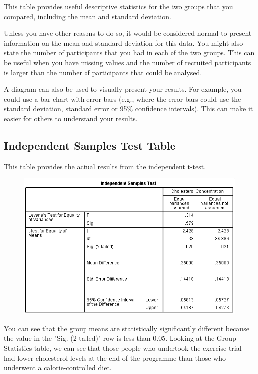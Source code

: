 \documentclass[]{article}
\begin{document}
	This table provides useful descriptive statistics for the two groups that you compared, including the mean and standard deviation.
	

	Unless you have other reasons to do so, it would be considered normal to present information on the mean and standard deviation for this data. You might also state the number of participants that you had in each of the two groups. This can be useful when you have missing values and the number of recruited participants is larger than the number of participants that could be analysed.
	
	
	A diagram can also be used to visually present your results. For example, you could use a bar chart with error bars (e.g., where the error bars could use the standard deviation, standard error or 95\% confidence intervals). This can make it easier for others to understand your results.
	
	\newpage
\subsection{Independent Samples Test Table}
	This table provides the actual results from the independent t-test.
	
\begin{figure}[h!]
	\centering
	\includegraphics[width=0.6\linewidth]{TwoSample/TwoSampleOutput2}
	
	\label{fig:TwoSampleOutput2}
\end{figure}

	You can see that the group means are statistically significantly different because the value in the "Sig. (2-tailed)" row is less than 0.05. Looking at the Group Statistics table, we can see that those people who undertook the exercise trial had lower cholesterol levels at the end of the programme than those who underwent a calorie-controlled diet.
	
\end{document}

